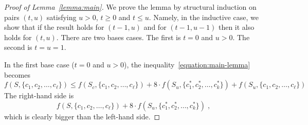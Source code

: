 \documentclass[9pt]{article}
\begin{document}
\begin{proof}[Proof of Lemma~\ref{lemma:main}]
We prove the lemma by structural induction on pairs $(t,u)$ satisfying $u > 0$,
$t \ge 0$ and $t \le u$. Namely, in the inductive case, we show that if the
result holds for $(t-1, u)$ and for $(t-1, u-1)$ then it also holds for
$(t,u)$. There are two bases cases.  The first is $t=0$ and $u > 0$. The second
is $t=u=1$.

In the first base case ($t=0$ and $u > 0$), the inequality~\eqref{equation:main-lemma} becomes
$$
f(S, \{c_1, c_2, \dots, c_\ell\})
\le f(S_c, \{c_1, c_2, \dots, c_\ell\}) + 8 \cdot f(S_u, \{c^*_1, c^*_2, \dots, c^*_k\}) + f(S_u, \{c_1, c_2, \dots, c_\ell\})
$$
The right-hand side is
$$
f(S, \{c_1, c_2, \dots, c_\ell\}) + 8 \cdot f(S_u, \{c^*_1, c^*_2, \dots, c^*_k\}) \; ,
$$
which is clearly bigger than the left-hand side.


\end{proof}
\end{document}
